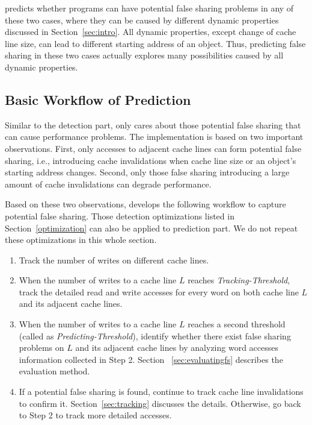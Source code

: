 \Predator{} predicts whether programs can have potential false sharing problems  
in any of these two cases, where they can be caused by different dynamic properties 
discussed in Section~\ref{sec:intro}.
All dynamic properties, except change of cache line size,
can lead to different starting address of an object. 
Thus, predicting false sharing in these two cases actually 
explores many possibilities caused by all dynamic properties.

\subsection{Basic Workflow of Prediction}
\label{sec:predictionmechanism} 

Similar to the detection part, 
\Predator{} only cares about those potential false sharing that can 
cause performance problems.
The implementation is based on
two important observations. First, only accesses to 
adjacent cache lines can form potential false sharing, 
i.e., introducing cache invalidations when cache line size
or an object's starting address changes.
Second, only those false sharing introducing a large amount of cache invalidations
can degrade performance.

Based on these two observations, \Predator{} develops 
the following workflow to capture potential false sharing.
Those detection optimizations listed in Section~\ref{optimization} can also be applied
to prediction part. We do not repeat these optimizations in
this whole section.

\begin{enumerate}
\item
Track the number of writes on different cache lines. 

\item
When the number of writes to a cache line $L$ reaches {\it Tracking-Threshold},
track the detailed read and write accesses for every word on both cache line $L$ 
and its adjacent cache lines. 

\item
When the number of writes to a cache line $L$ reaches a second threshold (called as
{\it Predicting-Threshold}), 
identify whether there exist false sharing problems on $L$ and its adjacent 
cache lines by analyzing word accesses information collected in Step 2. 
Section ~\ref{sec:evaluatingfs} describes the evaluation method.

\item
If a potential false sharing is found, continue to track cache line invalidations
to confirm it. Section~\ref{sec:tracking} discusses the details.
Otherwise, go back to Step 2 to track more detailed accesses.
 
\end{enumerate}

